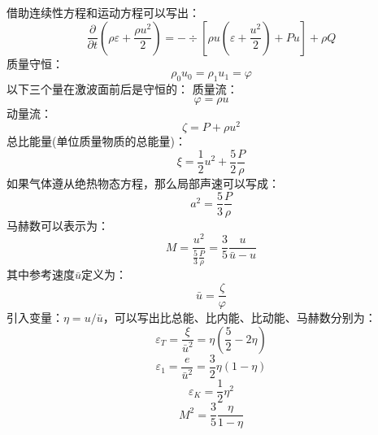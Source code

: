 借助连续性方程和运动方程可以写出：
\begin{equation}
	\frac{\partial}{\partial t}\left(\rho\varepsilon +\frac{\rho u^2}{2}\right)=-\div \left[\rho u\left(\varepsilon+\frac{u^2}{2}\right)+Pu\right]+\rho Q
\end{equation}
质量守恒：
\begin{equation}
	\rho_{0}u_{0}=\rho_{1}u_{1}=\varphi
\end{equation}
以下三个量在激波面前后是守恒的：
质量流：
\begin{equation}
	\varphi=\rho u
\end{equation}
动量流：
\begin{equation}
	\zeta=P+\rho u^2
\end{equation}
总比能量(单位质量物质的总能量)：
\begin{equation}
	\xi =\frac{1}{2}u^2+\frac{5}{2}\frac{P}{\rho}
\end{equation}
如果气体遵从绝热物态方程，那么局部声速可以写成：
\begin{equation}
	a^2=\frac{5}{3}\frac{P}{\rho}
\end{equation}
马赫数可以表示为：
\begin{equation}
	M=\frac{u^2}{\frac{5}{3}\frac{P}{\rho}}=\frac{3}{5}\frac{u}{\bar{u}-u}
\end{equation}
其中参考速度$\bar{u}$定义为：
\begin{equation}
	\bar{u}=\frac{\zeta}{\varphi}
\end{equation}
引入变量：$\eta=u/\bar{u}$，可以写出比总能、比内能、比动能、马赫数分别为：
\begin{equation}
	\varepsilon_{T}=\frac{\xi}{\bar{u}^2}=\eta\left(\frac{5}{2}-2\eta\right)
\end{equation}
\begin{equation}
	\varepsilon_{1}=\frac{e}{\bar{u}^2}=\frac{3}{2}\eta\left(1-\eta\right)
\end{equation}
\begin{equation}
	\varepsilon_{K}=\frac{1}{2}\eta^2
\end{equation}
\begin{equation}
	M^2=\frac{3}{5}\frac{\eta}{1-\eta}
\end{equation}

